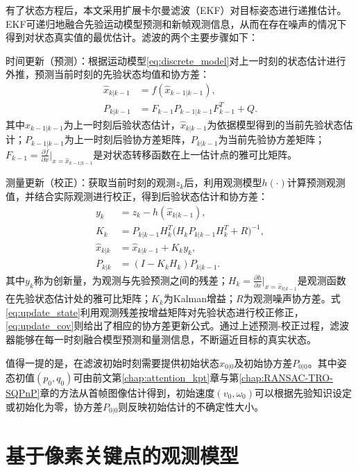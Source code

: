 有了状态方程后，本文采用扩展卡尔曼滤波（EKF）对目标姿态进行递推估计。EKF可递归地融合先验运动模型预测和新帧观测信息，从而在存在噪声的情况下得到对状态真实值的最优估计。滤波的两个主要步骤如下：

时间更新（预测）：根据运动模型\eqref{eq:discrete_model}对上一时刻的状态估计进行外推，预测当前时刻的先验状态均值和协方差： \begin{align} \hat{x}_{k|k-1} &= f(\hat{x}_{k-1|k-1}), \label{eq:predict_state}\\ P_{k|k-1} &= F_{k-1}P_{k-1|k-1}F_{k-1}^T + Q. \label{eq:predict_cov} \end{align} 其中$\hat{x}_{k-1|k-1}$为上一时刻后验状态估计，$\hat{x}_{k|k-1}$为依据模型得到的当前先验状态估计；$P_{k-1|k-1}$为上一时刻后验协方差矩阵，$P_{k|k-1}$为当前先验协方差矩阵；$F_{k-1} = \frac{\partial f}{\partial x}\big|_{x=\hat{x}_{k-1|k-1}}$是对状态转移函数在上一估计点的雅可比矩阵。

测量更新（校正）：获取当前时刻的观测$z_k$后，利用观测模型$h(\cdot)$计算预测观测值，并结合实际观测进行校正，得到后验状态估计和协方差： \begin{align} y_k &= z_k - h(\hat{x}_{k|k-1}), \label{eq:innov}\\ K_k &= P_{k|k-1}H_k^T \big(H_kP_{k|k-1}H_k^T + R\big)^{-1}, \label{eq:kgain}\\ \hat{x}_{k|k} &= \hat{x}_{k|k-1} + K_ky_k, \label{eq:update_state}\\ P_{k|k} &= (I - K_kH_k)P_{k|k-1}. \label{eq:update_cov} \end{align} 其中$y_k$称为创新量，为观测与先验预测之间的残差；$H_k = \frac{\partial h}{\partial x}\big|_{x=\hat{x}_{k|k-1}}$是观测函数在先验状态估计处的雅可比矩阵；$K_k$为Kalman增益；$R$为观测噪声协方差。式\eqref{eq:update_state}利用观测残差按增益矩阵对先验状态进行校正修正，\eqref{eq:update_cov}则给出了相应的协方差更新公式。通过上述预测-校正过程，滤波器能够在每一时刻融合模型预测和量测信息，不断逼近目标的真实状态。

值得一提的是，在滤波初始时刻需要提供初始状态$\hat{x}_{0|0}$及初始协方差$P_{0|0}$。其中姿态初值$(p_0, q_0)$可由前文第\ref{chap:attention_kpt}章与第\ref{chap:RANSAC-TRO-SQPnP}章的方法从首帧图像估计得到，初始速度$(v_0, \omega_0)$可以根据先验知识设定或初始化为零，协方差$P_{0|0}$则反映初始估计的不确定性大小。

\section{基于像素关键点的观测模型}

